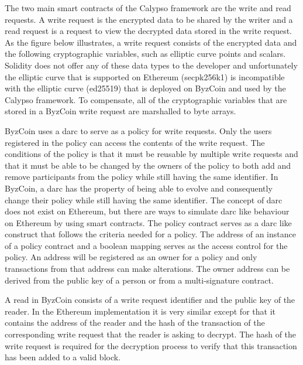 \documentclass[12pt]{article}
\begin{document}
The two main smart contracts of the Calypso framework are the write and read requests. A write request is the encrypted data to be shared by the writer and a read request is a request to view the decrypted data stored in the write request. As the figure below illustrates, a write request consists of the encrypted data and the following cryptographic variables, such as elliptic curve points and scalars. Solidity does not offer any of these data types to the developer and unfortunately the elliptic curve that is supported on Ethereum (secpk256k1) is incompatible with the elliptic curve (ed25519) that is deployed on ByzCoin and used by the Calypso framework. To compensate, all of the cryptographic variables that are stored in a ByzCoin write request are marshalled to byte arrays.

ByzCoin uses a darc to serve as a policy for write requests. Only the users registered in the policy can access the contents of the write request. The conditions of the policy is that it must be reusable by multiple write requests and that it must be able to be changed by the owners of the policy to both add and remove participants from the policy while still having the same identifier. In ByzCoin, a darc has the property of being able to evolve and consequently change their policy while still having the same identifier. The concept of darc does not exist on Ethereum, but there are ways to simulate darc like behaviour on Ethereum by using smart contracts. The policy contract serves as a darc like construct that follows the criteria needed for a policy. The address of an instance of a policy contract and a boolean mapping serves as the access control for the policy. An address will be registered as an owner for a policy and only transactions from that address can make alterations. The owner address can be derived from the public key of a person or from a multi-signature contract.

A read in ByzCoin consists of a write request identifier and the public key of the reader. In the Ethereum implementation it is very similar except for that it contains the address of the reader and the hash of the transaction of the corresponding write request that the reader is asking to decrypt. The hash of the write request is required for the decryption process to verify that this transaction has been added to a valid block.
\end{document}
